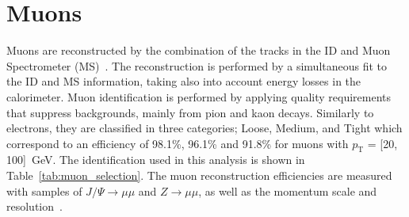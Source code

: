 \section{Muons}
Muons are reconstructed by the combination of the tracks in the ID and Muon Spectrometer (MS)~\cite{PERF-2015-10}. 
The reconstruction is performed by a simultaneous fit to the ID and MS information, taking also into account energy losses in the calorimeter.
Muon identification is performed by applying quality requirements that suppress backgrounds, mainly from pion and kaon decays. 
Similarly to electrons, they are classified in three categories; Loose, Medium, and Tight which correspond to an efficiency of 98.1\%, 96.1\% and 91.8\% for muons with $p_\mathrm{T}$ = [20, 100]~GeV.
The identification used in this analysis is shown in Table~\ref{tab:muon_selection}.
The muon reconstruction efficiencies are measured with samples of $J/\Psi \rightarrow \mu\mu$ and $Z\rightarrow \mu\mu$, as well as the momentum scale and resolution~\cite{MUON-2018-03}.
